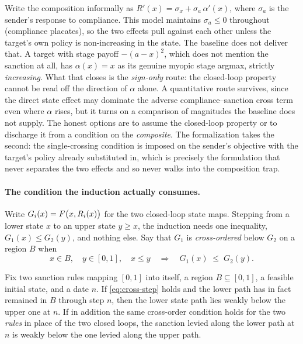 Write the composition informally as $R'(x)=\sigma_x+\sigma_a\,\alpha'(x)$, where
$\sigma_a$ is the sender's response to compliance. This model maintains
$\sigma_a\le0$ throughout (compliance placates), so the two effects pull
against each other unless the target's own policy is non-increasing in the state.
The baseline does not deliver that. A target with stage payoff $-(a-x)^2$, which
does not mention the sanction at all, has $\alpha(x)=x$ as its genuine myopic
stage argmax, strictly \emph{increasing}. What that closes is the \emph{sign-only}
route: the closed-loop property cannot be read off the direction of $\alpha$ alone.
A quantitative route survives, since the direct state effect may dominate the
adverse compliance--sanction cross term even where $\alpha$ rises, but it turns on a comparison of
magnitudes the baseline does not supply. The honest options are to assume the
closed-loop property or to discharge it from a condition on the \emph{composite}. The
formalization takes the second: the single-crossing condition is imposed on the
sender's objective with the target's policy already substituted in, which is
precisely the formulation that never separates the two effects and so never
walks into the composition trap.

\paragraph{The condition the induction actually consumes.}
Write $G_i(x)=F\bigl(x,R_i(x)\bigr)$ for the two closed-loop state maps. Stepping
from a lower state $x$ to an upper state $y\ge x$, the induction needs one
inequality, $G_1(x)\le G_2(y)$, and nothing else. Say that $G_1$ is
\emph{cross-ordered} below $G_2$ on a region $B$ when
\begin{equation}
x\in B,\quad y\in[0,1],\quad x\le y
\quad\Longrightarrow\quad
G_1(x)\;\le\; G_2(y).
\label{eq:cross-step}
\end{equation}

\begin{proposition}
\label{prop:cross-step-paths}
Fix two sanction rules mapping $[0,1]$ into itself, a region $B\subseteq[0,1]$, a
feasible initial state, and a date $n$. If \eqref{eq:cross-step} holds and the
lower path has in fact remained in $B$ through step $n$, then the lower state path
lies weakly below the upper one at $n$. If in addition the same cross-order
condition holds for the two \emph{rules} in place of the two closed loops, the
sanction levied along the lower path at $n$ is weakly below the one levied along
the upper path.
\end{proposition}

